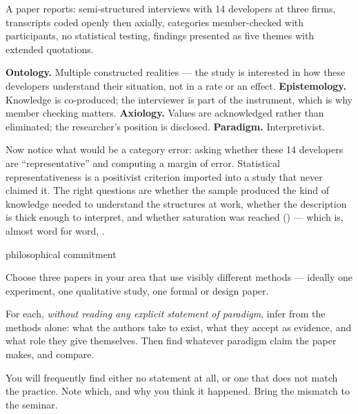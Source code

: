 \begin{worked}
A paper reports: semi-structured interviews with 14 developers at three firms,
transcripts coded openly then axially, categories member-checked with
participants, no statistical testing, findings presented as five themes with
extended quotations.

\medskip
\textbf{Ontology.} Multiple constructed realities --- the study is interested
in how these developers understand their situation, not in a rate or an effect.
\textbf{Epistemology.} Knowledge is co-produced; the interviewer is part of the
instrument, which is why member checking matters.
\textbf{Axiology.} Values are acknowledged rather than eliminated; the
researcher's position is disclosed.
\textbf{Paradigm.} Interpretivist.

\medskip
Now notice what would be a category error: asking whether these 14 developers
are ``representative'' and computing a margin of error. Statistical
representativeness is a positivist criterion imported into a study that never
claimed it. The right questions are whether the sample produced the kind of
knowledge needed to understand the structures at work, whether the description
is thick enough to interpret, and whether saturation was reached
() --- which is, almost word for word,
.
\end{worked}

\begin{traditions}{philosophical commitment}
\end{traditions}

\begin{lab}
Choose three papers in your area that use visibly different methods --- ideally
one experiment, one qualitative study, one formal or design paper.

\medskip
For each, \emph{without reading any explicit statement of paradigm}, infer from
the methods alone: what the authors take to exist, what they accept as
evidence, and what role they give themselves. Then find whatever paradigm claim
the paper makes, and compare.

\medskip
You will frequently find either no statement at all, or one that does not match
the practice. Note which, and why you think it happened. Bring the mismatch to
the seminar.
\end{lab}

